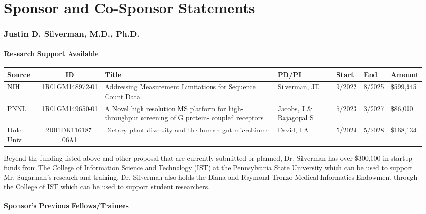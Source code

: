 \documentclass{NIHGrant}
\begin{document}
\thispagestyle{empty}

\part*{Sponsor and Co-Sponsor Statements}
\vspace{10pt}

\section*{Justin D. Silverman, M.D., Ph.D. }

\subsection*{Research Support Available}

\begin{center}
\renewcommand{\arraystretch}{1.3}
  \fontsize{9pt}{9pt}\selectfont
  \begin{tabular}{| p{0.5in} | c | p{1.5in} | p{1in} | p{0.5in} | p{0.5in} | p{0.7in} |}
    \hline 
    \textbf{Source} & \textbf{ID} & \textbf{Title} & \textbf{PD/PI} & \textbf{Start} & \textbf{End} & \textbf{Amount} \\
    \hline
    NIH & 1R01GM148972-01 & Addressing Measurement Limitations for Sequence Count Data &  Silverman, JD & 9/2022 & 8/2025 & \$599,945 \\
    \hline
    PNNL & 1R01GM149650-01 & A Novel high resolution MS platform for high-throughput screening of G protein- coupled receptors & Jacobs, J \& Rajagopal S & 6/2023 & 3/2027 & \$86,000 \\
    \hline 
    Duke Univ  & 2R01DK116187-06A1 & Dietary plant diversity and the human gut microbiome & David, LA & 5/2024 & 5/2028 & \$168,134 \\
    \hline
  \end{tabular}
\end{center}

Beyond the funding listed above and other proposal that are currently submitted
or planned, Dr. Silverman has over \$300,000 in startup funds from The College
of Information Science and Technology (IST) at the Pennsylvania State University
which can be used to support Mr. Sugarman's research and training. Dr. Silverman
also holds the Diana and Raymond Tronzo Medical Informatics Endowment through
the College of IST which can be used to support student researchers.

\subsection*{Sponsor's Previous Fellows/Trainees}
\end{document}
